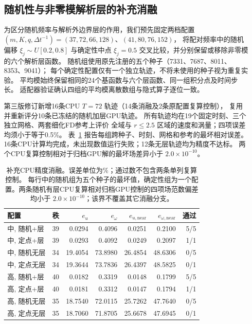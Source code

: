 \subsection{随机性与非零模解析层的补充消融}
\label{sec:review-ablation}
为区分随机频率与解析外边界层的作用，我们预先固定两档配置
$(m,K,q,\Delta t^{-1})=(37,72,66,128)$、$(41,80,76,152)$，
将配对频率中的随机偏移 $\xi_j\sim U[0.2,0.8]$ 与确定性中点
$\xi_j=0.5$ 交叉比较，并分别保留或移除非零模的六个解析层函数。
随机组使用原先注册的五个种子（7331、7687、8011、8353、9041）；
每个确定性配置仅有一个独立轨迹，不将未使用的种子视为重复实验。
平均模始终保留相同的24个基函数与六个层函数、同一组积分点及时间步长。
适配器验证确认四组的平均模离散数组与隐式算子逐位一致。

第三版修订新增16条CPU $T=72$ 轨迹（14条消融及2条原配置复算控制），
复用并重新评分10条已冻结的随机加层GPU轨迹。
所有轨迹均在19个固定时刻、三个独立网格、两套细化FD参考上评价
全域与 $r\leq2.5$ 区域的速度和涡量；四项误差均须小于等于0.5\%。
表~\ref{tab:review-ablation} 报告每组跨种子、时刻、网格和参考的最坏相对误差。
16条CPU计算均完成，未出现数值运行失败；12条无层轨迹均为精度不达标。
两个CPU复算控制相对于归档GPU解的最坏场差异小于 $2.0\times10^{-10}$。

\begin{table}[htbp]
\centering\small
\caption{补充CPU精度消融。误差单位为\%；通过数不包含两条单列复算控制。
每行中的随机组为五个种子的最坏值，确定性组为一个配置。两条随机有层CPU复算相对归档GPU控制的四项场范数偏差均小于 $2.0\times10^{-10}$；该界不覆盖其它消融分支。}
\label{tab:review-ablation}
\begin{tabular}{lrrrrrr}
\hline
配置 & 秩 & $e_u$ & $e_\omega$ & $e_{u,\mathrm{near}}$ & $e_{\omega,\mathrm{near}}$ & 通过 \\
\hline
中, 随机+层 & 39 & 0.0294 & 0.4096 & 0.0251 & 0.2100 & 5/5 \\
中, 定点+层 & 39 & 0.0293 & 0.4092 & 0.0249 & 0.2097 & 1/1 \\
中, 随机无层 & 34 & 19.4054 & 73.8980 & 26.4854 & 48.6306 & 0/5 \\
中, 定点无层 & 34 & 19.3644 & 73.7836 & 26.4397 & 48.5825 & 0/1 \\
高, 随机+层 & 40 & 0.0182 & 0.3319 & 0.0148 & 0.1799 & 5/5 \\
高, 定点+层 & 40 & 0.0181 & 0.3312 & 0.0147 & 0.1794 & 1/1 \\
高, 随机无层 & 35 & 18.7540 & 72.0115 & 25.7262 & 47.7640 & 0/5 \\
高, 定点无层 & 35 & 18.7060 & 71.8705 & 25.6678 & 47.6945 & 0/1 \\
\hline
\end{tabular}
\end{table}

